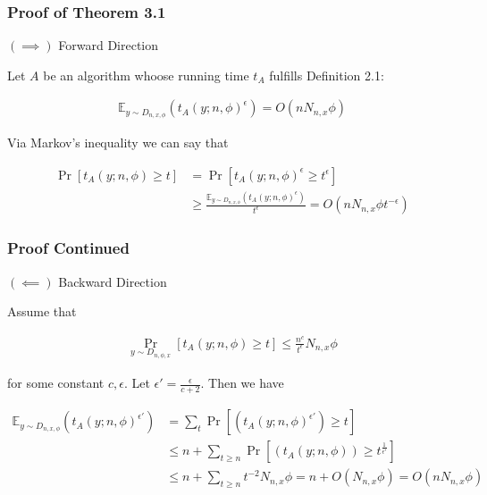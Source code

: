 \begin{frame}
    \frametitle{Proof of Theorem 3.1}

    $(\implies)$ Forward Direction

    Let $A$ be an algorithm whoose running time $t_A$ fulfills Definition 2.1:

    \begin{align*}
        \mathbb{E}_{y \sim D_{n, x, \phi}} \left(t_A(y; n, \phi) ^{\epsilon}\right) = O(nN_{n,x}\phi)
    \end{align*}

    Via Markov's inequality we can say that

    \begin{align*}
        \Pr[t_A(y; n, \phi) \geq t] & = \Pr[t_A(y; n, \phi)^\epsilon \geq t^\epsilon]                                                                      \\
                                    & \geq \frac{\mathbb{E}_{y \sim D_{n, x, \phi}}(t_A(y; n, \phi)^\epsilon)}{t^\epsilon} = O(nN_{n,x}\phi t^{-\epsilon})
    \end{align*}

\end{frame}

\begin{frame}
    \frametitle{Proof Continued}

    $(\impliedby)$ Backward Direction

    Assume that

    \begin{align*}
        \Pr_{y \sim D_{n, \phi, x}}[t_A(y;n, \phi) \geq t] \leq \frac{n^c}{t^{\epsilon}} N_{n,x} \phi
    \end{align*}

    for some constant $c, \epsilon$. Let $\epsilon' = \frac{\epsilon}{c + 2}$. Then
    we have

    \begin{align*}
        \mathbb{E}_{y \sim D_{n, x, \phi}}\left(t_A(y; n, \phi) ^{\epsilon'}\right) & = \displaystyle\sum_{t} \Pr\left[\left(t_A(y; n, \phi) ^{\epsilon'}\right) \geq t\right]                        \\
                                                                                    & \leq n + \displaystyle\sum_{t \geq n} \Pr\left[\left(t_A(y; n, \phi)\right) \geq t^{\frac{1}{\epsilon'}}\right] \\
                                                                                    & \leq n + \displaystyle\sum_{t \geq n} t^{-2}N_{n, x} \phi = n + O(N_{n, x} \phi) = O(nN_{n, x} \phi)
    \end{align*}

\end{frame}

